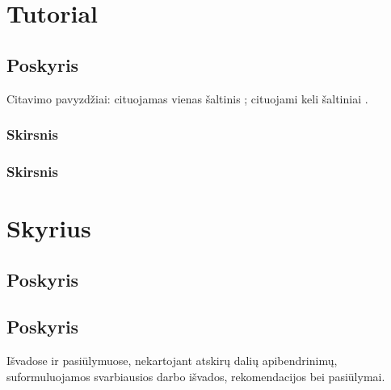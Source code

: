 \documentclass{VUMIFInfKursinis}
\begin{document}
\section{Tutorial}
\subsection{Poskyris}
\cite{test1}
Citavimo pavyzdžiai: cituojamas vienas šaltinis \cite{PvzStraipsnLt}; cituojami
keli šaltiniai \cite{PvzStraipsnEn, PvzKonfLt, PvzKonfEn, PvzKnygLt, PvzKnygEn,
PvzElPubLt, PvzElPubEn, PvzMagistrLt, PvzPhdEn}.

\subsubsection{Skirsnis}
\subsubsection{Skirsnis}
\section{Skyrius}
\subsection{Poskyris}
\subsection{Poskyris}

Išvadose ir pasiūlymuose, nekartojant atskirų dalių apibendrinimų,
suformuluojamos svarbiausios darbo išvados, rekomendacijos bei pasiūlymai.

\printbibliography[heading=bibintoc] %

\appendix  %
\end{document}
